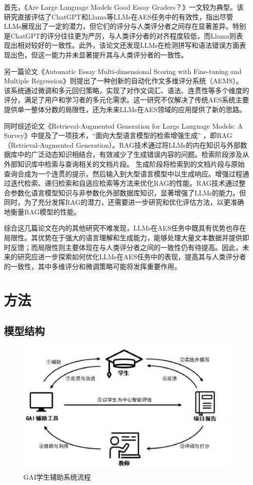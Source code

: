 \documentclass{article}
\begin{document}
首先，《Are Large Language Models Good Essay Graders？》\cite{ref7}一文较为典型。该研究直接评估了ChatGPT和Llama等LLMs在AES任务中的有效性，指出尽管LLMs展现出了一定的潜力，但它们的评分与人类评分者之间存在显著差异。特别是ChatGPT的评分往往更为严厉，与人类评分者的对齐程度较低，而Llama则表现出相对较好的一致性。此外，该论文还发现LLMs在检测拼写和语法错误方面表现出色，但这一能力并未显著提升其与人类评分者的一致性。

另一篇论文《Automatic Essay Multi-dimensional Scoring with Fine-tuning and Multiple Regression》\cite{ref8}则提出了一种创新的自动化作文多维评分系统（AEMS）。该系统通过微调和多元回归策略，实现了对作文词汇、语法、连贯性等多个维度的评分，满足了用户和学习者的多元化需求。这一研究不仅解决了传统AES系统主要提供单一整体分数的局限性，还为未来LLMs在AES领域的应用提供了新的思路。

同时综述论文《Retrieval-Augmented Generation for Large Language Models: A Survey》\cite{ref9}中提及了一项技术，“面向大型语言模型的检索增强生成” ，即RAG（Retrieval-Augmented Generation）。RAG技术通过将LLMs的内在知识与外部数据库中的广泛动态知识相结合，有效减少了生成错误内容的问题。检索阶段涉及从外部知识库中检索与查询相关的文档片段。 生成阶段将检索到的文档片段与原始查询合成为一个连贯的提示，然后输入到大型语言模型中以生成响应。增强过程通过迭代检索、递归检索和自适应检索等方法来优化RAG的性能。RAG技术通过整合参数化语言模型知识与非参数化外部数据库知识，显著增强了LLMs的能力。但同时，为了充分发挥RAG的潜力，还需要进一步研究和优化评估方法，以更准确地衡量RAG模型的性能。 

综合这几篇论文在内的其他研究不难发现，LLMs在AES任务中既具有优势也存在局限性。其优势在于强大的语言理解和生成能力，能够处理大量文本数据并提供即时反馈；而局限性则主要体现在与人类评分者之间的一致性仍有待提高。因此，未来的研究应进一步探索如何优化LLMs在AES任务中的表现，提高其与人类评分者的一致性，其中多维评分和微调策略可能将发挥重要作用。

\section{方法}

\subsection{模型结构}

\begin{figure}[H]
    \centering
    \includegraphics[width=0.75\linewidth]{img/model.png}
    \caption{GAI学生辅助系统流程}
    \label{fig:GAI}
\end{figure}
\end{document}
